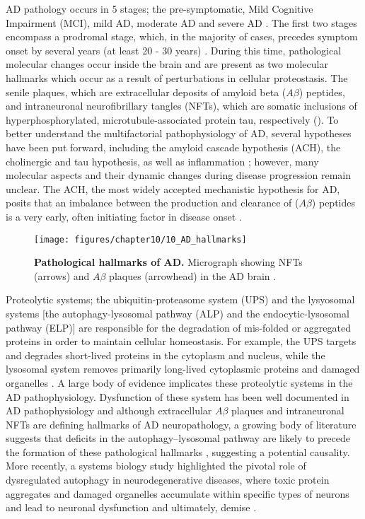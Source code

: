 AD pathology occurs in 5 stages; the pre-symptomatic, Mild Cognitive Impairment (MCI), mild AD, moderate AD and severe AD \citep{Caldwell2015}. The first two stages encompass a prodromal stage, which, in the majority of cases, precedes symptom onset by several years (at least 20 - 30 years) \citep{Caldwell2015,Caselli2013,Penn1993}. During this time, pathological molecular changes occur inside the brain and are present as two molecular hallmarks which occur as a result of perturbations in cellular proteostasis. The senile plaques, which are extracellular deposits of amyloid beta ($A\beta$)
peptides, and intraneuronal neurofibrillary tangles (NFTs), which are somatic inclusions of hyperphosphorylated, microtubule-associated protein tau, respectively \citep{Mattson2008} (). To better understand the multifactorial pathophysiology of AD, several hypotheses have been put forward, including the amyloid cascade hypothesis (ACH), the cholinergic and tau hypothesis, as well as inflammation \citep{Kurz2011}; however, many molecular aspects and their dynamic changes during disease progression remain unclear. The ACH, the most widely accepted mechanistic hypothesis for AD, posits that an imbalance between the production and clearance of ($A\beta$) peptides is a very early, often initiating factor in disease onset \citep{Hardy2009,Hardy1992}.

\begin{figure}[!htbp]
  \texttt{[image: figures/chapter10/10\_AD\_hallmarks]}
  \caption[Pathological hallmarks of AD]{\textbf{Pathological hallmarks of AD.} Micrograph showing NFTs (arrows) and $A\beta$ plaques (arrowhead) in the AD brain \citep{Nixon2007} .}
  \label{fig:10_AD_hallmarks}
\end{figure}

Proteolytic systems; the ubiquitin-proteasome system (UPS) and the lysyosomal systems [the autophagy-lysosomal pathway (ALP) and the endocytic-lysosomal pathway (ELP)] are responsible for the degradation of mis-folded or aggregated proteins in order to maintain cellular homeostasis. For example, the UPS targets and degrades short-lived proteins in the cytoplasm and nucleus, while the lysosomal system removes primarily long-lived cytoplasmic proteins and damaged organelles \citep{Ravikumar2003,Rubinsztein2005}. A large body of evidence implicates these proteolytic systems in the AD pathophysiology. Dysfunction of these system has been well documented in AD pathophysiology and although extracellular $A\beta$ plaques and intraneuronal NFTs are defining hallmarks of AD neuropathology, a growing body of literature suggests that deficits in the autophagy–lysosomal pathway are likely to precede the formation of these pathological hallmarks \citep{Cataldo2000,Nixon2011,Perez2015,zare-shahabadi2015}, suggesting a potential causality. More recently, a systems biology study highlighted the pivotal role of dysregulated autophagy in neurodegenerative diseases, where toxic protein aggregates and damaged organelles accumulate within specific types of neurons and lead to neuronal dysfunction and ultimately, demise \citep{Caberlotto2014}.

